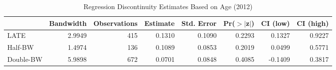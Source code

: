 \begin{table}[ht]
\centering
\begin{tabular}{lrrrrrrr}
  \hline
 & Bandwidth & Observations & Estimate & Std. Error & Pr($>$$|$z$|$) & CI (low) & CI (high) \\ 
  \hline
LATE & 2.9949 & 415 & 0.1310 & 0.1090 & 0.2293 & 0.1327 & 0.9227 \\ 
  Half-BW & 1.4974 & 136 & 0.1089 & 0.0853 & 0.2019 & 0.0499 & 0.5771 \\ 
  Double-BW & 5.9898 & 672 & 0.0701 & 0.0848 & 0.4085 & -0.1409 & 0.3817 \\ 
   \hline
\end{tabular}
\caption{Regression Discontinuity Estimates Based on Age (2012)} 
\label{tab:rd2012y}
\end{table}
